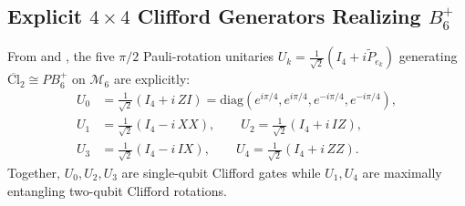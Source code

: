 \documentclass[11pt,a4paper]{article}
\theoremstyle{plain}
\theoremstyle{definition}
\theoremstyle{remark}
\newcommand{\PCl}{\overline{\mathrm{Cl}}}
\newcommand{\Mman}{\mathcal{M}_6}
\newcommand{\Bplus}{B_6^+}
\newcommand{\PBplus}{PB_6^+}
\begin{document}
\subsection{Explicit \texorpdfstring{$4\times 4$}{4x4} Clifford Generators Realizing \texorpdfstring{$\Bplus$}{B6+}}
From  and , the five $\pi/2$ Pauli-rotation unitaries $U_k = \frac{1}{\sqrt{2}}(I_4 + i\tilde{P}_{e_k})$ generating $\PCl_2 \cong \PBplus$ on $\Mman$ are explicitly:
\begin{align*}
  U_0 &= \tfrac{1}{\sqrt{2}}(I_4 + i\, ZI) = \mathrm{diag}(e^{i\pi/4}, e^{i\pi/4}, e^{-i\pi/4}, e^{-i\pi/4}), \\
  U_1 &= \tfrac{1}{\sqrt{2}}(I_4 - i\, XX), \qquad
  U_2 = \tfrac{1}{\sqrt{2}}(I_4 + i\, IZ), \\
  U_3 &= \tfrac{1}{\sqrt{2}}(I_4 - i\, IX), \qquad
  U_4 = \tfrac{1}{\sqrt{2}}(I_4 + i\, ZZ).
\end{align*}
Together, $U_0, U_2, U_3$ are single-qubit Clifford gates while $U_1, U_4$ are maximally entangling two-qubit Clifford rotations.
\end{document}
